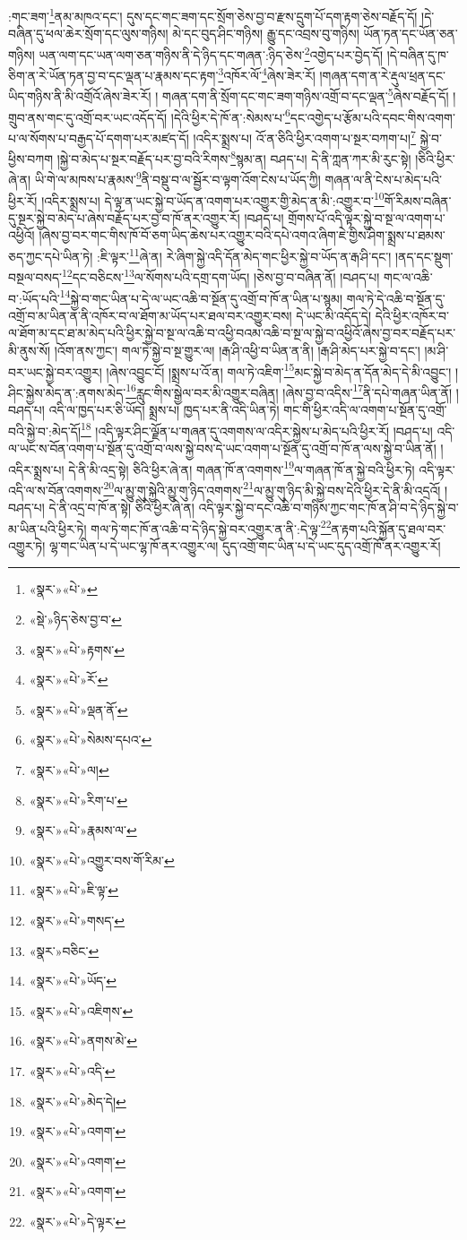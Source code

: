 :གང་ཟག་\footnote{«སྣར་»«པེ་»}ནམ་མཁའ་དང་། དུས་དང་གང་ཟག་དང་སྲོག་ཅེས་བྱ་བ་རྫས་དྲུག་པོ་དག་རྟག་ཅེས་བརྗོད་དོ། །དེ་བཞིན་དུ་ཕལ་ཆེར་སྲོག་དང་ལུས་གཉིས། མེ་དང་བུད་ཤིང་གཉིས། རྒྱུ་དང་འབྲས་བུ་གཉིས། ཡོན་ཏན་དང་ཡོན་ཅན་གཉིས། ཡན་ལག་དང་ཡན་ལག་ཅན་གཉིས་ནི་དེ་ཉིད་དང་གཞན་:ཉིད་ཅེས་\footnote{«སྡེ་»ཉིད་ཅེས་བྱ་བ་}འགྱེད་པར་བྱེད་དོ། །དེ་བཞིན་དུ་ཁ་ཅིག་ན་རེ་ཡོན་ཏན་བྱ་བ་དང་ལྡན་པ་རྣམས་དང་རྟག་\footnote{«སྣར་»«པེ་»རྟགས་}འཁོར་ལོ་\footnote{«སྣར་»«པེ་»རོ་}ཞེས་ཟེར་རོ། །གཞན་དག་ན་རེ་རྡུལ་ཕྲན་དང་ཡིད་གཉིས་ནི་མི་འགྲོའོ་ཞེས་ཟེར་རོ། །
གཞན་དག་ནི་སྲོག་དང་གང་ཟག་གཉིས་འགྲོ་བ་དང་ལྡན་\footnote{«སྣར་»«པེ་»ལྡན་ནོ་}ཞེས་བརྗོད་དོ། །གྲུབ་ནས་གང་དུ་འགྲོ་བར་ཡང་འདོད་དོ། །དེའི་ཕྱིར་དེ་ཁོ་ན་:སེམས་པ་\footnote{«སྣར་»«པེ་»སེམས་དཔའ་}དང་འགྱེད་པ་རྩོམ་པའི་དབང་གིས་འགག་པ་ལ་སོགས་པ་བརྒྱད་པོ་དགག་པར་མཛད་དོ། །འདིར་སྨྲས་པ། འོ་ན་ཅིའི་ཕྱིར་འགག་པ་སྔར་བཀག་པ།\footnote{«སྣར་»«པེ་»ལ།} སྐྱེ་བ་ཕྱིས་བཀག །སྐྱེ་བ་མེད་པ་སྔར་བརྗོད་པར་བྱ་བའི་རིགས་\footnote{«སྣར་»«པེ་»རིག་པ་}སྙམ་ན། བཤད་པ། དེ་ནི་ཀླན་ཀར་མི་རུང་སྟེ། །ཅིའི་ཕྱིར་ཞེ་ན། ཡི་གེ་ལ་མཁས་པ་རྣམས་\footnote{«སྣར་»«པེ་»རྣམས་ལ་}ནི་བསྡུ་བ་ལ་སྦྱོར་བ་ལྟག་འོག་ངེས་པ་ཡོད་ཀྱི། གཞན་ལ་ནི་ངེས་པ་མེད་པའི་ཕྱིར་རོ། །འདིར་སྨྲས་པ། དེ་ལྟ་ན་ཡང་སྐྱེ་བ་ཡོད་ན་འགག་པར་འགྱུར་གྱི་མེད་ན་མི་:འགྱུར་བ་\footnote{«སྣར་»«པེ་»འགྱུར་བས་གོ་རིམ་}གོ་རིམས་བཞིན་དུ་སྔར་སྐྱེ་བ་མེད་པ་ཞེས་བརྗོད་པར་བྱ་བ་ཁོ་ནར་འགྱུར་རོ། །བཤད་པ། གྲོགས་པོ་འདི་ལྟར་སྐྱེ་བ་སྔ་ལ་འགག་པ་འཕྱིའོ། །ཞེས་བྱ་བར་གང་གིས་ཁོ་བོ་ཅག་ཡིད་ཆེས་པར་འགྱུར་བའི་དཔེ་འགའ་ཞིག་ཇེ་གྱིས་ཤིག་སྨྲས་པ་ཐམས་ཅད་ཀྱང་དཔེ་ཡིན་ཏེ། :ཇི་ལྟར་\footnote{«སྣར་»«པེ་»ཇི་ལྟ་}ཞེ་ན། རེ་ཞིག་སྐྱེ་འདི་དོན་མེད་གང་ཕྱིར་སྐྱེ་བ་ཡོད་ན་རྒ་ཤི་དང་། །ནད་དང་སྡུག་བསྔལ་བསད་\footnote{«སྣར་»«པེ་»གསད་}དང་བཅིངས་\footnote{«སྣར་»བཅིང་}ལ་སོགས་པའི་དགྲ་དག་ཡོད། །ཅེས་བྱ་བ་བཞིན་ནོ། །བཤད་པ། གང་ལ་འཆི་བ་:ཡོད་པའི་\footnote{«སྣར་»«པེ་»ཡོད་}སྐྱེ་བ་གང་ཡིན་པ་དེ་ལ་ཡང་འཆི་བ་སྔོན་དུ་འགྲོ་བ་ཁོ་ན་ཡིན་པ་སྙམ། གལ་ཏེ་དེ་འཆི་བ་སྔོན་དུ་འགྲོ་བ་མ་ཡིན་ན་ནི་འཁོར་བ་ལ་ཐོག་མ་ཡོད་པར་ཐལ་བར་འགྱུར་བས། དེ་ཡང་མི་འདོད་དེ། དེའི་ཕྱིར་འཁོར་བ་ལ་ཐོག་མ་དང་ཐ་མ་མེད་པའི་ཕྱིར་སྐྱེ་བ་སྔ་ལ་འཆི་བ་འཕྱི་བའམ་འཆི་བ་སྔ་ལ་སྐྱེ་བ་འཕྱིའོ་ཞེས་བྱ་བར་བརྗོད་པར་མི་ནུས་སོ། །འོག་ནས་ཀྱང་། གལ་ཏེ་སྐྱེ་བ་སྔ་གྱུར་ལ། །རྒ་ཤི་འཕྱི་བ་ཡིན་ན་ནི། །རྒ་ཤི་མེད་པར་སྐྱེ་བ་དང་། །མ་ཤི་བར་ཡང་སྐྱེ་བར་འགྱུར། །ཞེས་འབྱུང་ངོ། །སྨྲས་པ་འོ་ན། གལ་ཏེ་འཇིག་\footnote{«སྣར་»«པེ་»འཇིགས་}མང་སྐྱེ་བ་མེད་ན་དོན་མེད་དེ་མི་འབྱུང་། །ཤིང་སྐྱེས་མེད་ན་:ནགས་མེད་\footnote{«སྣར་»«པེ་»ནགས་མེ་}རླུང་གིས་སྒྱེལ་བར་མི་འགྱུར་བཞིན། །ཞེས་བྱ་བ་འདིས་\footnote{«སྣར་»«པེ་»འདི་}ནི་དཔེ་གཞན་ཡིན་ནོ། །བཤད་པ། འདི་ལ་ཁྱད་པར་ཅི་ཡོད། སྨྲས་པ། ཁྱད་པར་ནི་འདི་ཡིན་ཏེ། གང་གི་ཕྱིར་འདི་ལ་འགག་པ་སྔོན་དུ་འགྲོ་བའི་སྐྱེ་བ་:མེད་དོ།\footnote{«སྣར་»«པེ་»མེད་དེ།} །འདི་ལྟར་ཤིང་ལྗོན་པ་གཞན་དུ་འགགས་ལ་འདིར་སྐྱེས་པ་མེད་པའི་ཕྱིར་རོ། །བཤད་པ། འདི་ལ་ཡང་ས་བོན་འགག་པ་སྔོན་དུ་འགྲོ་བ་ལས་སྐྱེ་བས་དེ་ཡང་འགག་པ་སྔོན་དུ་འགྲོ་བ་ཁོ་ན་ལས་སྐྱེ་བ་ཡིན་ནོ། །འདིར་སྨྲས་པ། དེ་ནི་མི་འདྲ་སྟེ། ཅིའི་ཕྱིར་ཞེ་ན། གཞན་ཁོ་ན་འགགས་\footnote{«སྣར་»«པེ་»འགག་}ལ་གཞན་ཁོ་ན་སྐྱེ་བའི་ཕྱིར་ཏེ། འདི་ལྟར་འདི་ལ་ས་བོན་འགགས་\footnote{«སྣར་»«པེ་»འགག་}ལ་མྱུ་གུ་སྐྱེའི་མྱུ་གུ་ཉིད་འགགས་\footnote{«སྣར་»«པེ་»འགག་}ལ་མྱུ་གུ་ཉིད་མི་སྐྱེ་བས་དེའི་ཕྱིར་དེ་ནི་མི་འདྲའོ། །བཤད་པ། དེ་ནི་འདྲ་བ་ཁོ་ན་སྟེ། ཅིའི་ཕྱིར་ཞེ་ན། འདི་ལྟར་སྐྱེ་བ་དང་འཆི་བ་གཉིས་ཀྱང་གང་ཁོ་ན་ཤི་བ་དེ་ཉིད་སྐྱེ་བ་མ་ཡིན་པའི་ཕྱིར་ཏེ། གལ་ཏེ་གང་ཁོ་ན་འཆི་བ་དེ་ཉིད་སྐྱེ་བར་འགྱུར་ན་ནི་:དེ་ལྟ་\footnote{«སྣར་»«པེ་»དེ་ལྟར་}ན་རྟག་པའི་སྐྱོན་དུ་ཐལ་བར་འགྱུར་ཏེ། ལྷ་གང་ཡིན་པ་དེ་ཡང་ལྷ་ཁོ་ནར་འགྱུར་ལ། དུད་འགྲོ་གང་ཡིན་པ་དེ་ཡང་དུད་འགྲོ་ཁོ་ནར་འགྱུར་རོ། 